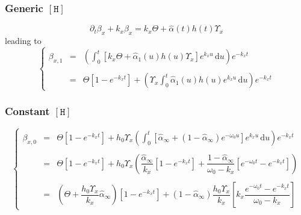 \documentclass[aps,onecolumn,12pt]{revtex4}
\newcommand{\mychem}[1]{\mathtt{#1}}
\newcommand{\myconc}[1]{\left\lbrack{#1}\right\rbrack}
\newcommand{\spproton}{\mychem{H}}
\newcommand{\proton}{\myconc{\spproton}}
\begin{document}
\subsubsection{Generic $\proton$}
\begin{equation}
\partial_t\beta_x + k_x \beta_x = k_x\Theta + \hat{\alpha}(t)h(t) \Upsilon_x
\end{equation}
leading to
\begin{equation}
\left\lbrace
\begin{array}{rcl}
\beta_{x,1} & = & \displaystyle \left( \int_0^t \left[k_x\Theta + \hat{\alpha}_1(u)h(u) \Upsilon_x \right]e^{k_xu}\,\mathrm{d}u \right) e^{-k_x t}\\
\\
 & = & \displaystyle \Theta \left[1-e^{-k_xt}\right] + \left(\Upsilon_x \int_0^t \hat{\alpha}_1(u)h(u) e^{k_xu}\,\mathrm{d}u \right)  e^{-k_x t}
\end{array}
\right.
\end{equation}

\subsubsection{Constant $\proton$}
\begin{equation}
\left\lbrace
\begin{array}{rcl}
\beta_{x,0} & = & \displaystyle \Theta \left[1-e^{-k_xt}\right] +h_0 \Upsilon_x
\left( \int_0^t \left[\hat\alpha_\infty + \left(1-\hat\alpha_\infty\right) e^{-\omega_0 u} \right]e^{k_xu} \,\mathrm{d}u \right) e^{-k_x t} \\
\\
& = & \displaystyle \Theta \left[1-e^{-k_xt}\right] +
h_0 \Upsilon_x 
	\left( 
		\dfrac{\hat\alpha_\infty}{k_x}\left[1-e^{-k_xt}\right]  
		+ \dfrac{1-\hat\alpha_\infty}{\omega_0 - k_x}\left[e^{-\omega_0t} - e^{-k_xt}\right]
	\right)\\
\\
& = & \left(\Theta+\dfrac{h_0\Upsilon_x}{k_x} \hat{\alpha}_\infty\right) \left[1-e^{-k_xt}\right] + (1-\hat\alpha_\infty) \dfrac{h_0\Upsilon_x}{k_x} \left[ k_x \dfrac{e^{-\omega_0t} - e^{-k_xt}}{\omega_0 - k_x}\right]
\end{array}
\right.
\end{equation}
\end{document}
